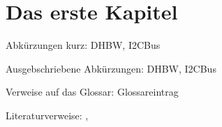 \chapter{Das erste Kapitel}
Abkürzungen kurz: \acrshort{DHBW}, \acrshort{I2CBus} 

Ausgebschriebene Abkürzungen: \gls{DHBW}, \acrshort{I2CBus}

Verweise auf das Glossar: \gls{Glossareintrag}

Literaturverweise: \cite{bib:ix042010}, \cite{bib:metasploitBuch}
